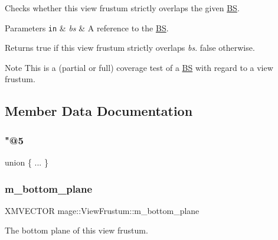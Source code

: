Checks whether this view frustum strictly overlaps the given \hyperlink{structmage_1_1_b_s}{BS}.


\begin{DoxyParams}[1]{Parameters}
\mbox{\tt in}  & {\em bs} & A reference to the \hyperlink{structmage_1_1_b_s}{BS}. \\
\hline
\end{DoxyParams}
\begin{DoxyReturn}{Returns}
{\ttfamily true} if this view frustum strictly overlaps {\itshape bs}. {\ttfamily false} otherwise. 
\end{DoxyReturn}
\begin{DoxyNote}{Note}
This is a (partial or full) coverage test of a \hyperlink{structmage_1_1_b_s}{BS} with regard to a view frustum. 
\end{DoxyNote}


\subsection{Member Data Documentation}
\hypertarget{structmage_1_1_view_frustum_a800a90316937b1848ea02aa785ba7072}{}\label{structmage_1_1_view_frustum_a800a90316937b1848ea02aa785ba7072} 
\subsubsection{\texorpdfstring{"@5}{@5}}
{\footnotesize\ttfamily union \{ ... \} \hspace{0.3cm}{\ttfamily [private]}}

\hypertarget{structmage_1_1_view_frustum_a66ea2332f1c30b7a1d3ba8f0f0fed347}{}\label{structmage_1_1_view_frustum_a66ea2332f1c30b7a1d3ba8f0f0fed347} 
\subsubsection{\texorpdfstring{m\+\_\+bottom\+\_\+plane}{m\_bottom\_plane}}
{\footnotesize\ttfamily X\+M\+V\+E\+C\+T\+OR mage\+::\+View\+Frustum\+::m\+\_\+bottom\+\_\+plane}

The bottom plane of this view frustum. \hypertarget{structmage_1_1_view_frustum_a02e8a940302c6c2a0d489f0fe35e7f19}{}\label{structmage_1_1_view_frustum_a02e8a940302c6c2a0d489f0fe35e7f19} 
